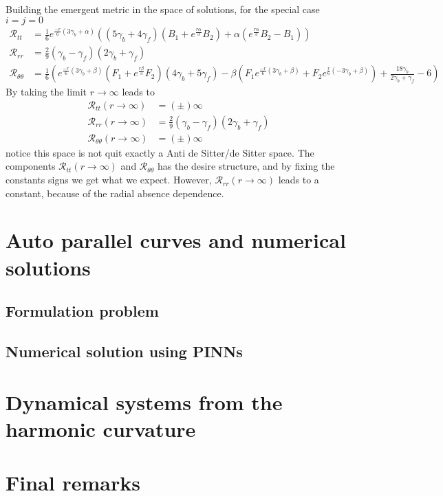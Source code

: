 \documentclass{article}
\begin{document}
Building the emergent metric in the space of solutions, for the special case $ i = j = 0$
\begin{align}
    \mathcal{R}_{tt} & = \frac{1}{6}e^{\frac{-r}{6}\left(3\gamma_b + \alpha\right)}\left(\left(5\gamma_b + 4\gamma_f\right)
    \left(B_1 +e^{\frac{r\alpha}{3}}B_2\right) + \alpha\left(e^{\frac{r\alpha}{3}}B_2 - B_1\right)\right) \\
    \mathcal{R}_{rr} & = \frac{2}{9}\left(\gamma_b - \gamma_f\right)\left(2\gamma_b + \gamma_f\right)\\
    \mathcal{R}_{\theta\theta} & = \frac{1}{6}\left(e^{\frac{-r}{6}\left(3\gamma_b + \beta\right)}\left(F_1 + e^{\frac{r\beta}{3}}F_2\right)\left(4\gamma_b + 5\gamma_f\right) - 
    \beta\left(F_1 e^{\frac{-r}{6}\left(3\gamma_b + \beta\right)} + F_2 e^{\frac{r}{6}\left(-3\gamma_b + \beta\right)}\right) + \frac{18\gamma_b}{2\gamma_b + \gamma_f} - 6\right)
\end{align}
By taking the limit $r \to \infty$ leads to
\begin{align}
    \mathcal{R}_{tt}(r \to \infty) & = (\pm)\infty \\
    \mathcal{R}_{rr}(r \to \infty) & = \frac{2}{9}\left(\gamma_b - \gamma_f\right)\left(2\gamma_b + \gamma_f\right)\\
    \mathcal{R}_{\theta\theta}(r \to \infty) & = (\pm)\infty
\end{align}
notice this space is not quit exactly a Anti de Sitter/de Sitter space. The components $\mathcal{R}_{tt}(r \to \infty)$
and $\mathcal{R}_{\theta\theta}$ has the desire structure, and by fixing the constants signs we get what we expect. However,
$\mathcal{R}_{rr}(r \to \infty)$ leads to a constant, because of the radial absence dependence. 

\section{Auto parallel curves and numerical solutions}

\subsection{Formulation problem}

\subsection{Numerical solution using PINNs}

\section{Dynamical systems from the harmonic curvature}

\section{Final remarks}
\label{sec:final_remarks}



\end{document}
